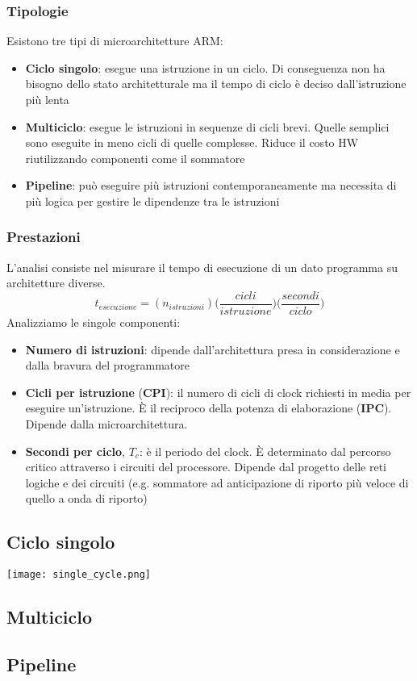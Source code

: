 \subsubsection{Tipologie}
Esistono tre tipi di microarchitetture ARM:
\begin{itemize}
	\item \textbf{Ciclo singolo}: esegue una istruzione in un ciclo. Di conseguenza non ha bisogno dello stato architetturale ma il tempo di ciclo è deciso dall'istruzione più lenta
	\item \textbf{Multiciclo}: esegue le istruzioni in sequenze di cicli brevi. Quelle semplici sono eseguite in meno cicli di quelle complesse. Riduce il costo HW riutilizzando componenti come il sommatore
	\item \textbf{Pipeline}: può eseguire più istruzioni contemporaneamente ma necessita di più logica per gestire le dipendenze tra le istruzioni
\end{itemize}

\subsubsection{Prestazioni}
L'analisi consiste nel misurare il tempo di esecuzione di un dato programma su architetture diverse.
\begin{equation}
	t_{esecuzione} = (n_{istruzioni})\bigg(\frac{cicli}{istruzione}\bigg)\bigg(\frac{secondi}{ciclo}\bigg)
\end{equation}
Analizziamo le singole componenti:
\begin{itemize}
	\item \textbf{Numero di istruzioni}: dipende dall'architettura presa in considerazione e dalla bravura del programmatore
	\item \textbf{Cicli per istruzione} (\textbf{CPI}): il numero di cicli di clock richiesti in media per eseguire un'istruzione. È il reciproco della potenza di elaborazione (\textbf{IPC}). Dipende dalla microarchitettura.
	\item \textbf{Secondi per ciclo}, \textbf{$T_c$}: è il periodo del clock. È determinato dal percorso critico attraverso i circuiti del processore. Dipende dal progetto delle reti logiche e dei circuiti (e.g. sommatore ad anticipazione di riporto più veloce di quello a onda di riporto)
\end{itemize}

\subsection{Ciclo singolo}
\begin{center}
	\texttt{[image: single\_cycle.png]}
\end{center}
\subsection{Multiciclo}
\subsection{Pipeline}